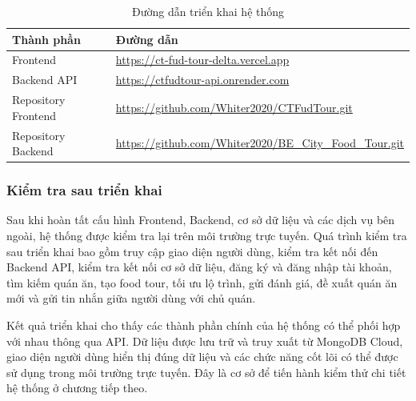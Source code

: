 \begin{table}[H]
\centering
\renewcommand{\arraystretch}{1.25}
\begin{tabular}{|p{4cm}|p{9cm}|}
\hline
\textbf{Thành phần} & \textbf{Đường dẫn} \\
\hline

Frontend &
\url{https://ct-fud-tour-delta.vercel.app} \\
\hline

Backend API &
\url{https://ctfudtour-api.onrender.com} \\
\hline

Repository Frontend &
\url{https://github.com/Whiter2020/CTFudTour.git} \\
\hline

Repository Backend &
\url{https://github.com/Whiter2020/BE_City_Food_Tour.git} \\
\hline

\end{tabular}
\caption{Đường dẫn triển khai hệ thống}
\label{tab:deployment-links}
\end{table}

\subsubsection{Kiểm tra sau triển khai}

Sau khi hoàn tất cấu hình Frontend, Backend, cơ sở dữ liệu và các dịch vụ bên ngoài,
hệ thống được kiểm tra lại trên môi trường trực tuyến. Quá trình kiểm tra sau triển khai
bao gồm truy cập giao diện người dùng, kiểm tra kết nối đến Backend API, kiểm tra kết nối
cơ sở dữ liệu, đăng ký và đăng nhập tài khoản, tìm kiếm quán ăn, tạo food tour, tối ưu lộ
trình, gửi đánh giá, đề xuất quán ăn mới và gửi tin nhắn giữa người dùng với chủ quán.

Kết quả triển khai cho thấy các thành phần chính của hệ thống có thể phối hợp với nhau
thông qua API. Dữ liệu được lưu trữ và truy xuất từ MongoDB Cloud, giao diện người
dùng hiển thị đúng dữ liệu và các chức năng cốt lõi có thể được sử dụng trong môi trường
trực tuyến. Đây là cơ sở để tiến hành kiểm thử chi tiết hệ thống ở chương tiếp theo.


\cleardoublepage
